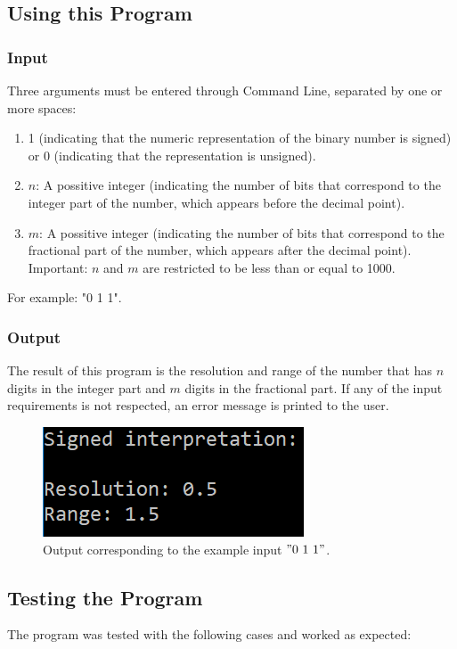 \subsection{\color{purple}Using this Program}
\subsubsection{\color{orange}Input}
Three arguments must be entered through Command Line, separated by one or more spaces:
\begin{enumerate}
\item  1 (indicating that the numeric representation of the binary number is signed) or 0 (indicating that the representation is unsigned).
\item $n$: A possitive integer (indicating the number of bits that correspond to the integer part of the number, which appears before the decimal point).
\item  $m$: A possitive integer (indicating the number of bits that correspond to the fractional part of the number, which appears after the decimal point).
Important: $n$ and $m$ are restricted to be less than or equal to 1000.
\end{enumerate}
{\color{cyan}For example: "0 1 1"}.

\subsubsection{\color{orange}Output}
The result of this program is the resolution and range of the number that has $n$ digits in the integer part and $m$ digits in the fractional part. If any of the input requirements is not respected, an error message is printed to the user.

\begin{figure}[h!]
\centering
\includegraphics[scale=1]{../E1TP1/ejemploOutput}
\caption{\color{cyan}Output corresponding to the example input $"0\ 1\ 1"$.}
\label{image output}
\end{figure}

\subsection{\color{purple}Testing the Program}
The program was tested with the following cases and worked as expected:
